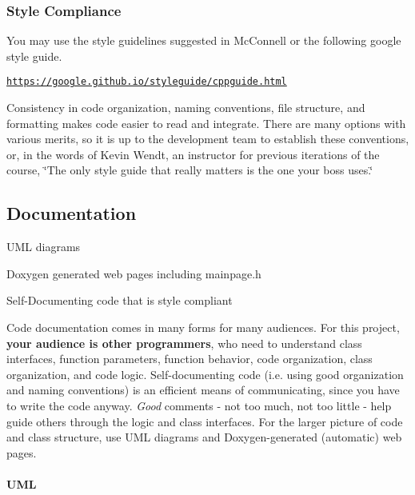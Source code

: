 \subsubsection*{Style Compliance}

You may use the style guidelines suggested in Mc\+Connell or the following google style guide.

\href{https://google.github.io/styleguide/cppguide.html}{\tt https\+://google.\+github.\+io/styleguide/cppguide.\+html}

Consistency in code organization, naming conventions, file structure, and formatting makes code easier to read and integrate. There are many options with various merits, so it is up to the development team to establish these conventions, or, in the words of Kevin Wendt, an instructor for previous iterations of the course, \char`\"{}\+The only style guide that really matters is the one your boss uses.\char`\"{}





\subsection*{Documentation}


\begin{DoxyItemize}
\item U\+ML diagrams
\item Doxygen generated web pages including mainpage.\+h
\item Self-\/\+Documenting code that is style compliant
\end{DoxyItemize}

Code documentation comes in many forms for many audiences. For this project, {\bfseries your audience is other programmers}, who need to understand class interfaces, function parameters, function behavior, code organization, class organization, and code logic. Self-\/documenting code (i.\+e. using good organization and naming conventions) is an efficient means of communicating, since you have to write the code anyway. {\itshape Good} comments -\/ not too much, not too little -\/ help guide others through the logic and class interfaces. For the larger picture of code and class structure, use U\+ML diagrams and Doxygen-\/generated (automatic) web pages.

\paragraph*{U\+ML}

